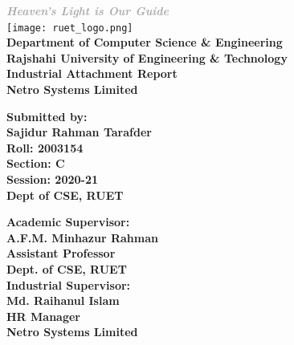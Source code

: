 \documentclass[12pt,a4paper]{report}
\begin{document}
\begin{titlepage}
    \thispagestyle{empty}
    \centering

    {\large \textit{\textbf{\textcolor{darkgray}{Heaven's Light is Our Guide}}}}\\[0.4cm]

    \texttt{[image: ruet\_logo.png]} \\[0.4cm]

    {\Large \textcolor{secondaryblue}{\textbf{Department of Computer Science \& Engineering}}}\\[0.3cm]
    {\Large \textcolor{primaryblue}{\textbf{Rajshahi University of Engineering \& Technology}}}\\[1.8cm]

    {\Huge \textcolor{primaryblue}{\textbf{Industrial Attachment Report}}}\\[0.8cm]
    {\LARGE \textcolor{skillcolor}{\textbf{Netro Systems Limited}}}\\[2cm]

    \begin{minipage}{0.45\textwidth}
        \raggedright
        {\Large \textcolor{primaryblue}{\textbf{Submitted by:}}}\\[0.3cm]
        {\large \textbf{Sajidur Rahman Tarafder}}\\
        \vspace{0.2cm}
        {\large \textbf{Roll: 2003154}}\\
        \vspace{0.2cm}
        {\large \textbf{Section: C}}\\
        \vspace{0.2cm}
        {\large \textbf{Session: 2020-21}}\\
        \vspace{0.2cm}
        {\large \textbf{Dept of CSE, RUET}}\\
    \end{minipage}%
    \hfill%
    \begin{minipage}{0.45\textwidth}
        \raggedleft
        {\Large \textcolor{primaryblue}{\textbf{Academic Supervisor:}}}\\[0.3cm]
        {\large \textbf{A.F.M. Minhazur Rahman}}\\
        {\large \textbf{Assistant Professor}}\\
        {\large \textbf{Dept. of CSE, RUET}}\\[0.8cm]

    {\Large \textcolor{primaryblue}{\textbf{Industrial Supervisor:}}}\\[0.3cm]
    {\large \textbf{Md. Raihanul Islam}}\\
    {\large \textbf{HR Manager}}\\
    {\large \textbf{Netro Systems Limited}}\\
    \end{minipage}

    \vfill
\end{titlepage}
\end{document}
